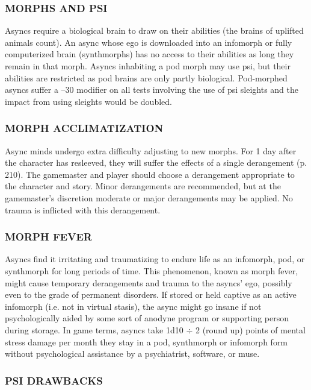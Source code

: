 \subsubsection{MORPHS AND PSI}

Asyncs require a biological brain to draw on their
abilities (the brains of uplifted animals count). An
async whose ego is downloaded into an infomorph or
fully computerized brain (synthmorphs) has no access
to their abilities as long they remain in that morph.
Asyncs inhabiting a pod morph may use psi, but
their abilities are restricted as pod brains are only
partly biological. Pod-morphed asyncs suffer a –30
modifier on all tests involving the use of psi sleights
and the impact from using sleights would be doubled.

\subsubsection{MORPH ACCLIMATIZATION}

Async minds undergo extra difficulty adjusting to new
morphs. For 1 day after the character has resleeved,
they will suffer the effects of a single derangement
(p. 210). The gamemaster and player should choose a
derangement appropriate to the character and story.
Minor derangements are recommended, but at the
gamemaster’s discretion moderate or major derangements
may be applied. No trauma is inflicted with
this derangement.

\subsubsection{MORPH FEVER}

Asyncs find it irritating and traumatizing to endure life
as an infomorph, pod, or synthmorph for long periods
of time. This phenomenon, known as morph fever,
might cause temporary derangements and trauma to
the asyncs’ ego, possibly even to the grade of permanent
disorders. If stored or held captive as an active
infomorph (i.e. not in virtual stasis), the async might
go insane if not psychologically aided by some sort of
anodyne program or supporting person during storage.
In game terms, asyncs take 1d10 $\div$ 2 (round up)
points of mental stress damage per month they stay
in a pod, synthmorph or infomorph form without
psychological assistance by a psychiatrist, software,
or muse.

\subsubsection{PSI DRAWBACKS}

